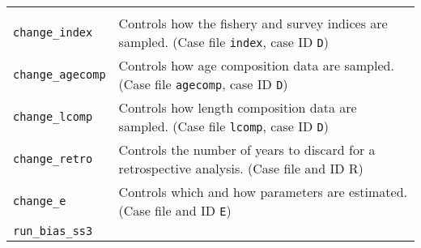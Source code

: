 \documentclass[10pt]{article}
\begin{document}
\begin{thebibliography}{10}
\begin{longtable}[c]{@{}ll@{}}
\begin{minipage}[t]{0.57\columnwidth}
\end{minipage}
\\\noalign{\medskip}
\begin{minipage}[t]{0.32\columnwidth}\raggedright
\texttt{change\_index}
\end{minipage} & \begin{minipage}[t]{0.57\columnwidth}\raggedright
Controls how the fishery and survey indices are sampled. (Case file \texttt{index}, case ID \texttt{D})
\end{minipage}
\\\noalign{\medskip}
\begin{minipage}[t]{0.32\columnwidth}\raggedright
\texttt{change\_agecomp}
\end{minipage} & \begin{minipage}[t]{0.57\columnwidth}\raggedright
Controls how age composition data are sampled. (Case file \texttt{agecomp}, case ID \texttt{D})
\end{minipage}
\\\noalign{\medskip}
\begin{minipage}[t]{0.32\columnwidth}\raggedright
\texttt{change\_lcomp}
\end{minipage} & \begin{minipage}[t]{0.57\columnwidth}\raggedright
Controls how length composition data are sampled. (Case file \texttt{lcomp}, case ID \texttt{D})
\end{minipage}
\\\noalign{\medskip}
\begin{minipage}[t]{0.32\columnwidth}\raggedright
\texttt{change\_retro}
\end{minipage} & \begin{minipage}[t]{0.57\columnwidth}\raggedright
Controls the number of years to discard for a retrospective analysis. (Case file and ID R)
\end{minipage}
\\\noalign{\medskip}
\begin{minipage}[t]{0.32\columnwidth}\raggedright
\texttt{change\_e}
\end{minipage} & \begin{minipage}[t]{0.57\columnwidth}\raggedright
Controls which and how parameters are estimated. (Case file and ID \texttt{E})
\end{minipage}
\\\noalign{\medskip}
\begin{minipage}[t]{0.32\columnwidth}\raggedright
\texttt{run\_bias\_ss3}
\end{minipage} & \begin{minipage}[t]{0.57\columnwidth}\raggedright

\end{minipage}
\end{longtable}
\end{thebibliography}
\end{document}
